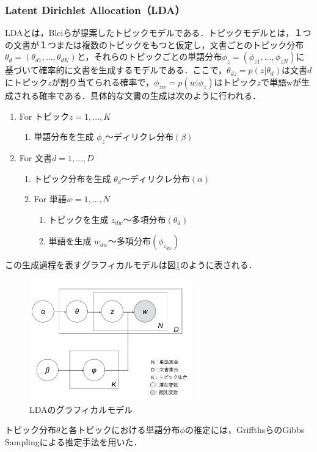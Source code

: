 \documentclass[a4paper,11pt,oneside,openany]{jsbook}
\begin{document}
		\subsubsection{Latent Dirichlet Allocation（LDA）}
LDAとは，Bleiらが提案したトピックモデルである．トピックモデルとは，１つの文書が１つまたは複数のトピックをもつと仮定し，文書ごとのトピック分布$\theta_{d} = (\theta_{d1},...,\theta_{dK})$と，それらのトピックごとの単語分布$\phi_{z} = (\phi_{z1},...,\phi_{zN})$に基づいて確率的に文書を生成するモデルである．ここで，$\theta_{dz} = p(z|\theta_{d})$は文書$d$にトピック$z$が割り当てられる確率で，$\phi_{zw} = p(w|\phi_{z})$はトピック$z$で単語wが生成される確率である．具体的な文書の生成は次のように行われる．
\begin{enumerate}
\item For トピック$z = 1, ... , K$
	\begin{enumerate}
	\setlength{\itemindent}{2cm}
 	\item 単語分布を生成 $\phi_{z} 〜 ディリクレ分布(\beta)$
	\end{enumerate}
\item For 文書$d = 1, ... ,D$
	\begin{enumerate}
	\setlength{\itemindent}{2cm}
 	\item トピック分布を生成 $\theta_{d} 〜 ディリクレ分布(\alpha)$
	\setlength{\itemindent}{2cm}
 	\item For 単語$w = 1, ... ,N$
		\begin{enumerate}
		\setlength{\itemindent}{3cm}
		\item トピックを生成 $z_{dw} 〜 多項分布(\theta_{d})$
		\setlength{\itemindent}{3cm}
		\item 単語を生成 $w_{dw} 〜 多項分布(\phi_{z_{dw}})$
		\end{enumerate}
	\end{enumerate}


\end{enumerate}

この生成過程を表すグラフィカルモデルは図\ref{fig:lda}のように表される．
\begin{figure}[tb]
	\begin{center} %
		\includegraphics[width = 70mm]{figures/LDA.pdf} %
	\end{center}
	\caption{LDAのグラフィカルモデル} %
	\label{fig:lda} %
\end{figure}
トピック分布$\theta$と各トピックにおける単語分布$\phi$の推定には，GriffthsらのGibbs Samplingによる推定手法を用いた\cite{gibbs}．
\end{document}
